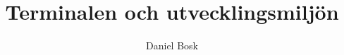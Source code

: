 \documentclass{article}
\begin{document}
\title{%
  Terminalen och utvecklingsmiljön
}
\author{Daniel Bosk}

\maketitle

\begin{abstract}
  
\end{abstract}



\printbibliography
\end{document}
